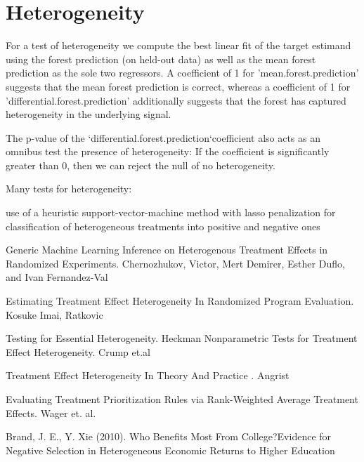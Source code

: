 \documentclass[oneside,11pt]{article}
\begin{document}
\section{Heterogeneity}

For a test of heterogeneity we compute the best linear fit of the target estimand using the forest prediction (on held-out data) as well as the mean forest prediction as the sole two regressors. A coefficient of 1 for 'mean.forest.prediction' suggests that the mean forest prediction is correct, whereas a coefficient of 1 for 'differential.forest.prediction' additionally suggests that the forest has captured heterogeneity in the underlying signal.

The p-value of the ‘differential.forest.prediction‘coefficient also acts as an omnibus test the presence of heterogeneity: If the coefficient is significantly greater than 0, then we can reject the null of no heterogeneity.


\begin{table}[H]
\caption{}
\label{}
\begin{center}
\scriptsize{}
\end{center}

\end{table}


Many tests for heterogeneity:


\cite{a3}  use of a heuristic support-vector-machine method with lasso penalization for classification of heterogeneous treatments into positive and negative ones

\begin{thebibliography}{2}

 Generic Machine Learning Inference on Heterogenous Treatment Effects in Randomized Experiments. Chernozhukov, Victor, Mert Demirer, Esther Duflo, and Ivan Fernandez-Val



 Estimating Treatment Effect Heterogeneity In Randomized Program Evaluation. Kosuke Imai, Ratkovic

 Testing for Essential Heterogeneity. Heckman
 Nonparametric  Tests  for Treatment  Effect  Heterogeneity. Crump et.al

 Treatment Effect Heterogeneity In Theory And Practice . Angrist

 Evaluating Treatment Prioritization Rules via Rank-Weighted Average Treatment Effects. Wager et. al.

 Brand, J. E., Y. Xie (2010). Who Benefits Most From College?Evidence for Negative Selection in Heterogeneous Economic Returns to Higher Education

\end{thebibliography}
\end{document}
